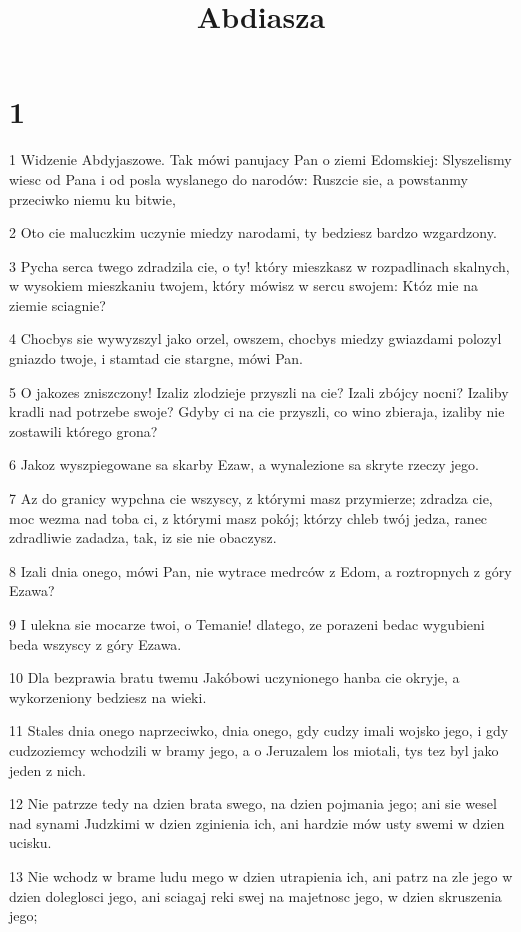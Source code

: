 

\title{Abdiasza}


\chapter{1}

\par 1 Widzenie Abdyjaszowe. Tak mówi panujacy Pan o ziemi Edomskiej: Slyszelismy wiesc od Pana i od posla wyslanego do narodów: Ruszcie sie, a powstanmy przeciwko niemu ku bitwie,
\par 2 Oto cie maluczkim uczynie miedzy narodami, ty bedziesz bardzo wzgardzony.
\par 3 Pycha serca twego zdradzila cie, o ty! który mieszkasz w rozpadlinach skalnych, w wysokiem mieszkaniu twojem, który mówisz w sercu swojem: Któz mie na ziemie sciagnie?
\par 4 Chocbys sie wywyzszyl jako orzel, owszem, chocbys miedzy gwiazdami polozyl gniazdo twoje, i stamtad cie stargne, mówi Pan.
\par 5 O jakozes zniszczony! Izaliz zlodzieje przyszli na cie? Izali zbójcy nocni? Izaliby kradli nad potrzebe swoje? Gdyby ci na cie przyszli, co wino zbieraja, izaliby nie zostawili którego grona?
\par 6 Jakoz wyszpiegowane sa skarby Ezaw, a wynalezione sa skryte rzeczy jego.
\par 7 Az do granicy wypchna cie wszyscy, z którymi masz przymierze; zdradza cie, moc wezma nad toba ci, z którymi masz pokój; którzy chleb twój jedza, ranec zdradliwie zadadza, tak, iz sie nie obaczysz.
\par 8 Izali dnia onego, mówi Pan, nie wytrace medrców z Edom, a roztropnych z góry Ezawa?
\par 9 I ulekna sie mocarze twoi, o Temanie! dlatego, ze porazeni bedac wygubieni beda wszyscy z góry Ezawa.
\par 10 Dla bezprawia bratu twemu Jakóbowi uczynionego hanba cie okryje, a wykorzeniony bedziesz na wieki.
\par 11 Stales dnia onego naprzeciwko, dnia onego, gdy cudzy imali wojsko jego, i gdy cudzoziemcy wchodzili w bramy jego, a o Jeruzalem los miotali, tys tez byl jako jeden z nich.
\par 12 Nie patrzze tedy na dzien brata swego, na dzien pojmania jego; ani sie wesel nad synami Judzkimi w dzien zginienia ich, ani hardzie mów usty swemi w dzien ucisku.
\par 13 Nie wchodz w brame ludu mego w dzien utrapienia ich, ani patrz na zle jego w dzien doleglosci jego, ani sciagaj reki swej na majetnosc jego, w dzien skruszenia jego;
